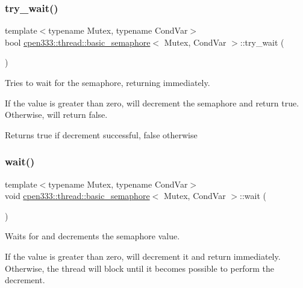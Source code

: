 \subsubsection{\texorpdfstring{try\+\_\+wait()}{try\_wait()}}
{\footnotesize\ttfamily template$<$typename Mutex, typename Cond\+Var$>$ \\
bool \hyperlink{classcpen333_1_1thread_1_1basic__semaphore}{cpen333\+::thread\+::basic\+\_\+semaphore}$<$ Mutex, Cond\+Var $>$\+::try\+\_\+wait (\begin{DoxyParamCaption}{ }\end{DoxyParamCaption})\hspace{0.3cm}{\ttfamily [inline]}}



Tries to wait for the semaphore, returning immediately. 

If the value is greater than zero, will decrement the semaphore and return true. Otherwise, will return false.

\begin{DoxyReturn}{Returns}
true if decrement successful, false otherwise 
\end{DoxyReturn}
\mbox{\label{classcpen333_1_1thread_1_1basic__semaphore_ac5cacef970643d393429ff87c0c6d6bf}} 
\subsubsection{\texorpdfstring{wait()}{wait()}}
{\footnotesize\ttfamily template$<$typename Mutex, typename Cond\+Var$>$ \\
void \hyperlink{classcpen333_1_1thread_1_1basic__semaphore}{cpen333\+::thread\+::basic\+\_\+semaphore}$<$ Mutex, Cond\+Var $>$\+::wait (\begin{DoxyParamCaption}{ }\end{DoxyParamCaption})\hspace{0.3cm}{\ttfamily [inline]}}



Waits for and decrements the semaphore value. 

If the value is greater than zero, will decrement it and return immediately. Otherwise, the thread will block until it becomes possible to perform the decrement. \mbox{\label{classcpen333_1_1thread_1_1basic__semaphore_a500ae89545ae6b639ad347d50a53e2a8}} 

